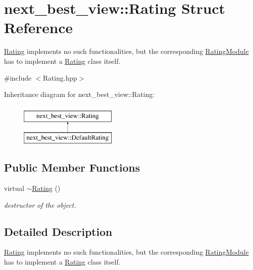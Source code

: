 \hypertarget{structnext__best__view_1_1Rating}{\section{next\-\_\-best\-\_\-view\-:\-:\-Rating \-Struct \-Reference}
\label{structnext__best__view_1_1Rating}
}


\hyperlink{structnext__best__view_1_1Rating}{\-Rating} implements no such functionalities, but the corresponding \hyperlink{classnext__best__view_1_1RatingModule}{\-Rating\-Module} has to implement a \hyperlink{structnext__best__view_1_1Rating}{\-Rating} class itself.  




{\ttfamily \#include $<$\-Rating.\-hpp$>$}

\-Inheritance diagram for next\-\_\-best\-\_\-view\-:\-:\-Rating\-:\begin{figure}[H]
\begin{center}
\leavevmode
\includegraphics[height=2.000000cm]{structnext__best__view_1_1Rating}
\end{center}
\end{figure}
\subsection*{\-Public \-Member \-Functions}
\begin{DoxyCompactItemize}
\item 
virtual \hyperlink{structnext__best__view_1_1Rating_a29ae3b5f6242f6973cc803de498e9c19}{$\sim$\-Rating} ()
\begin{DoxyCompactList}\small\item\em destructor of the object. \end{DoxyCompactList}\end{DoxyCompactItemize}


\subsection{\-Detailed \-Description}
\hyperlink{structnext__best__view_1_1Rating}{\-Rating} implements no such functionalities, but the corresponding \hyperlink{classnext__best__view_1_1RatingModule}{\-Rating\-Module} has to implement a \hyperlink{structnext__best__view_1_1Rating}{\-Rating} class itself. 

